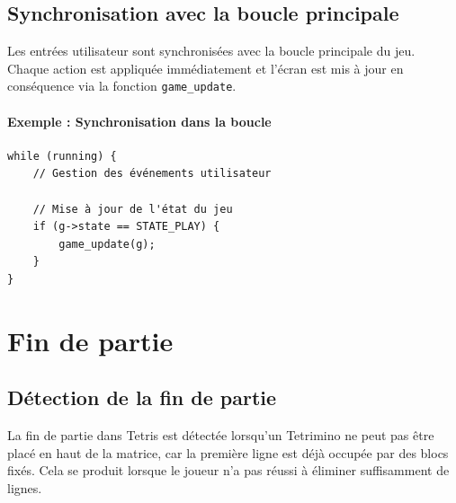 \documentclass[12pt,a4paper]{report}
\begin{document}
\newpage
\subsection{Synchronisation avec la boucle principale}
Les entrées utilisateur sont synchronisées avec la boucle principale du jeu. Chaque action est appliquée immédiatement et l’écran est mis à jour en conséquence via la fonction \texttt{game\_update}.

\paragraph{Exemple : Synchronisation dans la boucle}
\begin{lstlisting}
while (running) {
    // Gestion des événements utilisateur

    // Mise à jour de l'état du jeu
    if (g->state == STATE_PLAY) {
        game_update(g);
    }
}
\end{lstlisting}

\section{Fin de partie}

\subsection{Détection de la fin de partie}
La fin de partie dans Tetris est détectée lorsqu’un Tetrimino ne peut pas être placé en haut de la matrice, car la première ligne est déjà occupée par des blocs fixés. Cela se produit lorsque le joueur n’a pas réussi à éliminer suffisamment de lignes.
\end{document}
